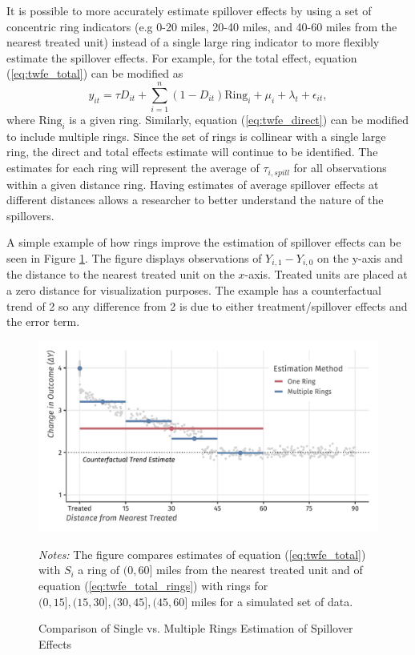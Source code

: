 \documentclass[11pt]{article}
\begin{document}
It is possible to more accurately estimate spillover effects by using a set of concentric ring indicators (e.g 0-20 miles, 20-40 miles, and 40-60 miles from the nearest treated unit) instead of a single large ring indicator to more flexibly estimate the spillover effects. For example, for the total effect, equation (\ref{eq:twfe_total}) can be modified as 
\begin{equation}\label{eq:twfe_total_rings}    
    y_{it} = \tau D_{it} + \sum_{i=1}^n (1-D_{it}) \text{Ring}_{i} + \mu_i + \lambda_t + \epsilon_{it},
\end{equation}
where $\text{Ring}_i$ is a given ring. Similarly, equation (\ref{eq:twfe_direct}) can be modified to include multiple rings. Since the set of rings is collinear with a single large ring, the direct and total effects estimate will continue to be identified. The estimates for each ring will represent the average of $\tau_{i,spill}$ for all observations within a given distance ring. Having estimates of average spillover effects at different distances allows a researcher to better understand the nature of the spillovers.

A simple example of how rings improve the estimation of spillover effects can be seen in Figure \ref{fig:example_rings}. The figure displays observations of $Y_{i,1} - Y_{i,0}$ on the y-axis and the distance to the nearest treated unit on the $x$-axis. Treated units are placed at a zero distance for visualization purposes. The example has a counterfactual trend of 2 so any difference from 2 is due to either treatment/spillover effects and the error term. 

\begin{figure}[tb!]
    \caption{Comparison of Single vs. Multiple Rings Estimation of Spillover Effects}
    \label{fig:example_rings}

    \includegraphics[width = \textwidth]{../../figures/figure-rings_v_within.pdf}

    {\footnotesize \textit{Notes:} The figure compares estimates of equation (\ref{eq:twfe_total}) with $S_i$ a ring of $(0, 60]$ miles from the nearest treated unit and of equation (\ref{eq:twfe_total_rings}) with rings for $(0,15], (15,30], (30,45], (45, 60]$ miles for a simulated set of data.}
\end{figure}
\end{document}
